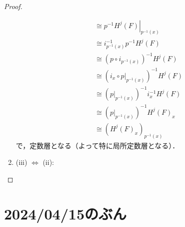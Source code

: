\begin{proof}
\begin{enumerate}
\begin{align*}
            &\cong
            p^{-1}\left. H^j\left(F\right)\right\rvert_{p^{-1}(x)}\\
            &\cong
            i^{-1}_{p^{-1}(x)}p^{-1}H^j\left(F\right)\\
            &\cong
            \left(p\circ i_{p^{-1}(x)}\right)^{-1}H^j\left(F\right)\\
            &\cong
            \left(i_{x}\circ p\rvert_{p^{-1}(x)}\right)^{-1}H^j\left(F\right)\\
            &\cong
            \left(p\rvert_{p^{-1}(x)}\right)^{-1}i_{x}^{-1}H^j\left(F\right)\\
            &\cong
            \left(p\rvert_{p^{-1}(x)}\right)^{-1}H^j\left(F\right)_{x}\\
            &\cong
            \left(H^j\left(F\right)_{x}\right)_{p^{-1}(x)}
        \end{align*}
        で，定数層となる（よって特に局所定数層となる）．
        \item\label{372-32} (iii) \(\Leftrightarrow\) (ii):      
    \end{enumerate}
\end{proof}


\clearpage

\section{2024/04/15のぶん}

